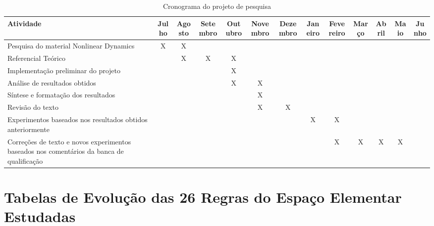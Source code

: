 \documentclass[12pt,a4paper]{article}
\begin{document}
\begin{landscape}
\begin{table}[t]
\caption{Cronograma do projeto de pesquisa}
\label{tab:schedule}
\begin{center}
\begin{tabular}{|p{7cm}|c|c|c|c|c|c|c|c|c|c|c|c|}
\hline
\footnotesize Atividade & \footnotesize Julho & \footnotesize Agosto & \footnotesize Setembro & \footnotesize Outubro & \footnotesize Novembro
& \footnotesize Dezembro & \footnotesize Janeiro & \footnotesize Fevereiro & \footnotesize Março & \footnotesize Abril
& \footnotesize Maio & \footnotesize Junho\\ \hline
{\footnotesize Pesquisa do material Nonlinear Dynamics}& X & X &   &   &   &   &   &   &   &   &   &   \\ \hline
{\footnotesize Referencial Teórico}                    &   & X & X & X &   &   &   &   &   &   &   &   \\ \hline
{\footnotesize Implementação preliminar do projeto}    &   &   &   & X &   &   &   &   &   &   &   &   \\ \hline
{\footnotesize Análise de resultados obtidos}          &   &   &   & X & X &   &   &   &   &   &   &   \\ \hline
{\footnotesize Síntese e formatação dos resultados}    &   &   &   &   & X &   &   &   &   &   &   &   \\ \hline
{\footnotesize Revisão do texto}                       &   &   &   &   & X & X &   &   &   &   &   &   \\ \hline
{\footnotesize Experimentos baseados nos resultados obtidos anteriormente}
                                                       &   &   &   &   &   &   & X & X &   &   &   &   \\ \hline
{\footnotesize Correções de texto e novos experimentos baseados nos comentários da banca de qualificação}
                                                       &   &   &   &   &   &   &   & X & X & X & X &   \\ \hline
\end{tabular}
\end{center}
\end{table}
\end{landscape}

\newpage

\appendix
\section{Tabelas de Evolução das 26 Regras do Espaço Elementar Estudadas}\label{sec:matrices}
\end{document}
